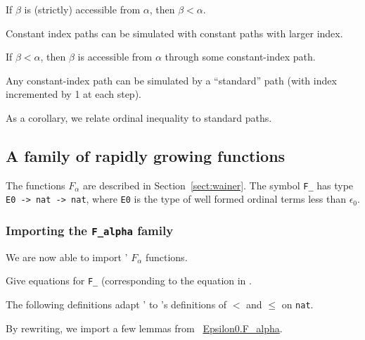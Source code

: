 If $\beta$ is (strictly) accessible from $\alpha$, then
$\beta<\alpha$.


Constant index paths can be simulated with constant paths with larger index.



If $\beta<\alpha$, then $\beta$ is accessible from $\alpha$
through some constant-index path.


Any constant-index path can be simulated by a ``standard'' path (with index incremented by 1 at each step).


As a corollary, we relate ordinal inequality to standard paths.


\subsection{A family of rapidly growing functions}

The functions $F_\alpha$ are described in Section~\vref{sect:wainer}. The symbol \texttt{F\_} has type \texttt{E0 -> nat -> nat},
where \texttt{E0} is the type of well formed ordinal terms less than $\epsilon_0$.

\subsubsection{Importing the \texttt{F\_alpha} family}

We are now able to import \HydrasLib' $F_\alpha$ functions.


\begin{todo}
  Give equations for \texttt{F\_} (corresponding to the equation
  in \HydrasLib.
\end{todo}




The following definitions adapt \HydrasLib' to \ssreflect's 
definitions of $<$ and $\leq$ on \texttt{nat}.


By rewriting, we import a few lemmas from
~\href{../theories/html/hydras.Epsilon0.F_alpha.html}{Epsilon0.F\_alpha}.



